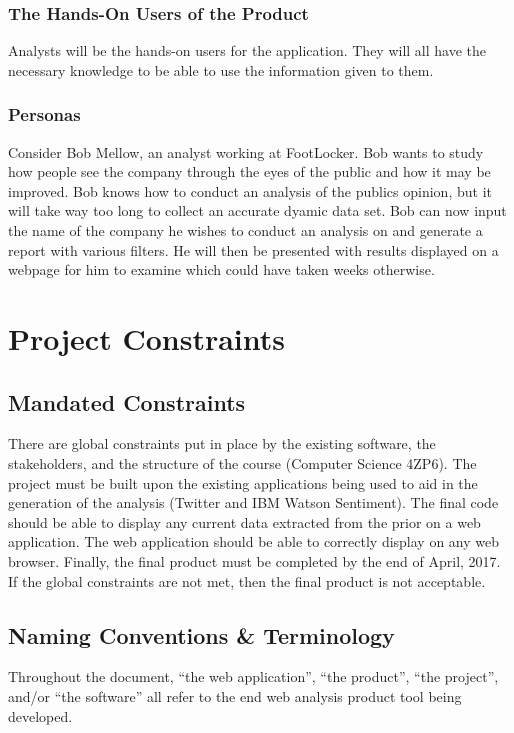 \documentclass[12pt]{article}
\begin{document}
\subsubsection{The Hands-On Users of the Product}
Analysts will be the hands-on users for the application. They will all have the necessary knowledge to be able to use the information given to them.
\subsubsection{Personas}
Consider Bob Mellow, an analyst working at FootLocker. Bob wants to study how people see the company through the eyes of the public and how it may be improved. Bob knows how to conduct an analysis of the publics opinion, but it will take way too long to collect an accurate dyamic data set. Bob can now input the name of the company he wishes to conduct an analysis on and generate a report with various filters. He will then be presented with results displayed on a webpage for him to examine which could have taken weeks otherwise.

\newpage
\section{Project Constraints}

\subsection{Mandated Constraints} %
There are global constraints put in place by the existing software, the stakeholders, and the structure of the course (Computer Science 4ZP6). The project must be built upon the existing applications being used to aid in the generation of the analysis (Twitter and IBM Watson Sentiment). The final code should be able to display any current data extracted from the prior on a web application. The web application should be able to correctly display on any web browser. Finally, the final product must be completed by the end of April, 2017. If the global constraints are not met, then the final product is not acceptable.\\ 


\subsection{Naming Conventions \& Terminology} %
Throughout the document, ``the web application'', ``the product'', ``the project'', and/or ``the software'' all refer to the end web analysis product tool being developed.\\ 
\end{document}
